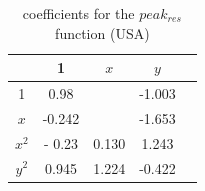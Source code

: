     \begin{table}[H]
        \centering
        \begin{tabular}{|c||c|c|c|c|}
            \hline
                  & 1   & $x$ & $y$ \\
                  \hline
                  \hline
            1     &0.98&      & -1.003\\
            \hline
            $x$   & -0.242  &       & -1.653 \\
                  \hline
            $x^2$ & - 0.23    &  0.130     & 1.243 \\
            \hline
            $y^2$ &  0.945   &   1.224    &-0.422 \\
                  \hline
                  \hline
        \end{tabular}
        \caption{ coefficients for the $peak_{res}$ function (USA)}
    \end{table}
